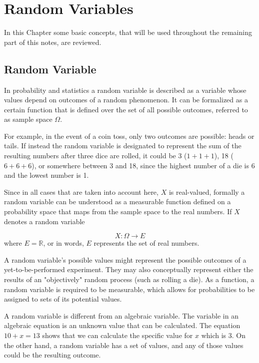 \chapter{Random Variables}\label{fundamentals}

In this Chapter some basic concepts, that will be used throughout the remaining part of this notes, are reviewed.

\section{Random Variable}\label{random-variables}

In probability and statistics a random variable is described as a variable whose values depend on outcomes of a random phenomenon. 
It can be formalized as a certain function that is defined over the set of all possible outcomes, referred to as sample space \(\Omega\). 

For example, in the event of a coin toss, only two outcomes 
are possible: heads or tails. 
If instead the random variable is designated to represent the sum of the resulting numbers after 
three dice are rolled, it could be 3 ($1 + 1+ 1$), 18 ($6 + 6 + 6$), or somewhere between 3 and 18, 
since the highest number of a die is 6 and the lowest number is 1.

Since in all cases that are taken into account here, \(X\) is real-valued, formally a random variable can be understood as a measurable function defined on a probability space 
that maps from the sample space to the real numbers.
If \(X\) denotes a random variable

\begin{equation}
X:\Omega \rightarrow E
\end{equation}
where \(E=\mathbb {R}\), or in words, \(E\) represents the set of real numbers. 

A random variable's possible values might represent the possible outcomes of a yet-to-be-performed experiment. 
They may also conceptually represent either the results of an "objectively" random process (such as rolling a die).
As a function, a random variable is required to be measurable, which allows for probabilities 
to be assigned to sets of its potential values. 

A random variable is different from an algebraic variable. The variable in an algebraic equation is an 
unknown value that can be calculated. The equation $10 + x = 13$ shows that we can calculate the specific 
value for $x$ which is 3. On the other hand, a random variable has a set of values, and any of those 
values could be the resulting outcome.

